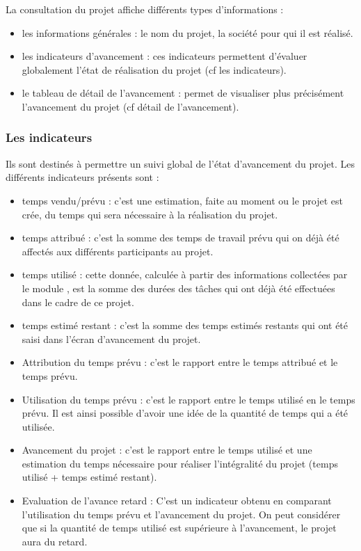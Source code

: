 La consultation du projet affiche différents types d'informations :\\

\begin{itemize}
\item les informations générales : le nom du projet, la société pour qui il est réalisé.
\item les indicateurs d'avancement : ces indicateurs permettent d'évaluer globalement l'état de réalisation du projet (cf les indicateurs).
\item le tableau de détail de l'avancement : permet de visualiser plus précisément l'avancement du projet (cf détail de l'avancement).
\end{itemize}

\subsubsection{Les indicateurs}

Ils sont destinés à permettre un suivi global de l'état d'avancement du projet.
Les différents indicateurs présents sont :

\begin{itemize}
\item temps vendu/prévu : c'est une estimation, faite au moment ou le projet est crée, du temps qui sera nécessaire à la réalisation du projet.
\item temps attribué : c'est la somme des temps de travail prévu qui on déjà été affectés aux différents participants au projet.
\item temps utilisé : cette donnée, calculée à partir des informations collectées par le module \timemanager, est la somme des durées des tâches qui ont déjà été effectuées dans le cadre de ce projet.
\item temps estimé restant : c'est la somme des temps estimés restants qui ont été saisi dans l'écran d'avancement du projet.
\item Attribution du temps prévu : c'est le rapport entre le temps attribué et le temps prévu.
\item Utilisation du temps prévu : c'est le rapport entre le temps utilisé en le temps prévu. Il est ainsi possible d'avoir une idée de la quantité de temps qui a été utilisée.
\item Avancement du projet : c'est le rapport entre le temps utilisé et une estimation du temps nécessaire pour réaliser l'intégralité du projet (temps utilisé + temps estimé restant).
\item Evaluation de l'avance retard : C'est un indicateur obtenu en comparant l'utilisation du temps prévu et l'avancement du projet. On peut considérer que si la quantité de temps utilisé est supérieure à l'avancement, le projet aura du retard.
\end{itemize}

